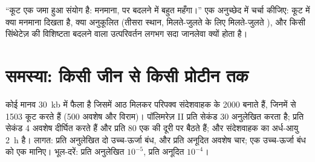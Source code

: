 \begin{exercise}[$\star\star\star$]\label{exo:b1:gene-expression:12}
``कूट एक जमा हुआ संयोग है: मनमाना, पर बदलने में बहुत महँगा।''
एक अनुच्छेद में चर्चा कीजिए: कूट में क्या मनमाना दिखता है, क्या
अनुकूलित (तीसरा स्थान, मिलते-जुलते  के लिए मिलते-जुलते
), और किसी सिंथेटेज़ की विशिष्टता बदलने वाला उत्परिवर्तन लगभग सदा
जानलेवा क्यों होता है।
\end{exercise}

\section{समस्या: किसी जीन से किसी प्रोटीन तक}

\begin{problem}
\label{pb:b1:gene-expression:1}
कोई मानव  \qty{30}{kb} में फैला है जिसमें आठ  मिलकर परिपक्व
संदेशवाहक के \qty{2000}{}  बनाते हैं, जिनमें से \qty{1503}{}
कूट करते हैं (500 अवशेष और विराम)। पॉलिमरेज़ II प्रति सेकंड
\qty{30}{}  अनुलेखित करता है;  प्रति सेकंड \qty{4}{}
अवशेष दीर्घित करते हैं और प्रति \qty{80}{}  एक की दूरी पर
बैठते हैं; और संदेशवाहक का अर्ध-आयु \qty{2}{h} है। लागत: प्रति अनुलेखित
 दो उच्च-ऊर्जा बंध, और प्रति अनूदित अवशेष चार;
एक उच्च-ऊर्जा बंध को एक  मानिए। भूल-दरें:
प्रति अनुलेखित  $10^{-5}$, प्रति अनूदित  $10^{-4}$।


\end{problem}
